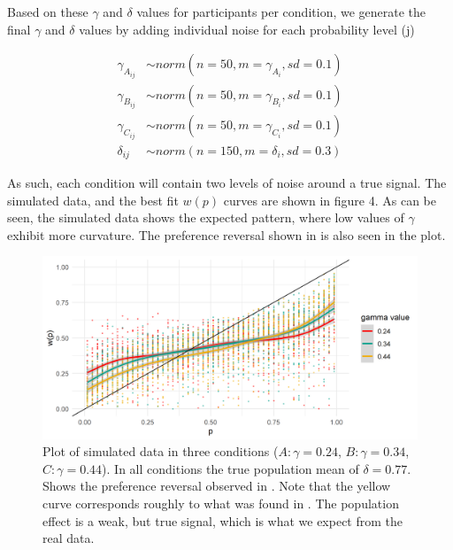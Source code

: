 \documentclass[12pt]{article}
\begin{document}
Based on these $\gamma$ and $\delta$ values for
participants per condition, we generate
the final $\gamma$ and $\delta$ values by
adding individual noise for each probability
level (j)

\begin{equation} \label{eq2}
\begin{split}
	\gamma_{A_{ij}} &\sim norm(n = 50,
	m = \gamma_{A_{i}}, sd = 0.1) \\
	\gamma_{B_{ij}} &\sim norm(n = 50,
	m = \gamma_{B_{i}}, sd = 0.1) \\
	\gamma_{C_{ij}} &\sim norm(n = 50,
	m = \gamma_{C_{i}}, sd = 0.1) \\
	\delta_{ij} &\sim norm(n = 150,
	m = \delta_{i}, sd = 0.3)
\end{split}
\end{equation}

As such, each condition will contain
two levels of noise around a true signal.
The simulated data, and the best fit
$w(p)$ curves are shown in figure 4.
As can be seen, the simulated data shows
the expected pattern, where low values of
$\gamma$ exhibit more curvature. The preference
reversal shown in \textcite{rottenstreich2001money}
is also seen in the plot.

\begin{figure}[H]
	\includegraphics[width = \linewidth]{../Figures/simulated.png}
	\caption{Plot of simulated data in three
		conditions ($A: \gamma = 0.24$,
		$B: \gamma = 0.34$,
		$C: \gamma = 0.44$). In all conditions
		the true population mean of
		$\delta = 0.77$. Shows the preference
		reversal observed in
	\textcite{rottenstreich2001money}. Note
	that the yellow curve corresponds
	roughly to what was found in
	\textcite{gonzalez1999shape}.
	The population effect is a
	weak, but true signal, which is
what we expect from the real data.}
\end{figure}
\end{document}
